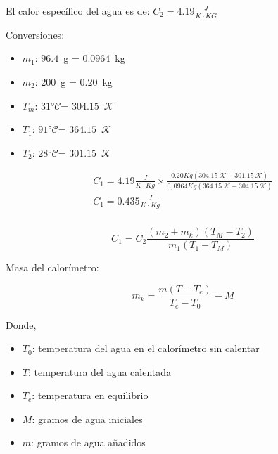 \documentclass[letterpaper, 12pt]{article}
\newcommand{\Celsius}[0]{°$\mathcal{C}$}
\newcommand{\Kelvin}[0]{$\mathcal{K}$}
\begin{document}
El calor específico del agua es de: \hfill{} \break{}
$C_{2} = 4.19\frac{J}{K\cdot KG}$

\smallskip

Conversiones:

\begin{itemize}[label=$\triangleright$]
      \item $m_{1}$: $96.4$~g = $0.0964$~kg
      \item $m_{2}$: $200$~g = $0.20$~kg
      \item $T_{m}$: $31$\Celsius = $304.15$~\Kelvin
      \item $T_{1}$: $91$\Celsius = $364.15$~\Kelvin
      \item $T_{2}$: $28$\Celsius = $301.15$~\Kelvin
\end{itemize}

\begin{equation*}
      \begin{gathered}
            C_{1} = 4.19 \frac{J}{K \cdot Kg} \times \frac{0.20 Kg (304.15~\mathcal{K} - 301.15~\mathcal{K})}{0,0964 Kg(364.15~\mathcal{K} - 304.15~\mathcal{K})} \\
            C_{1} = 0.435 \frac{J}{K \cdot Kg}
      \end{gathered}
\end{equation*}

\subsubsection{}

\begin{equation}
      C_{1} = C_{2} \frac{(m_{2} + m_{k})(T_{M} - T_{2})}{m_{1}(T_{1} - T_{M})}
      \label{eq:calor_especifico_2}
\end{equation}

Masa del calorímetro:

\begin{equation}
      m_{k} = \frac{m(T - T_{e})}{T_{e} - T_{0}} - M
      \label{eq:masa_calorimetro}
\end{equation}

Donde,

\begin{itemize}[label=$\triangleright$]
      \item $T_{0}$: temperatura del agua en el calorímetro sin calentar
      \item $T$: temperatura del agua calentada
      \item $T_{e}$: temperatura en equilibrio
      \item $M$: gramos de agua iniciales
      \item $m$: gramos de agua añadidos
\end{itemize}
\end{document}
